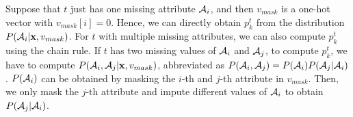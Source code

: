 Suppose that $t$ just  has one missing attribute  $\mathcal{A}_i$, and then $v_{mask}$ is a one-hot vector with $v_{mask}[i] = 0$. Hence, we can directly obtain $p_k^t$  from the distribution $P(\mathcal{A}_i | \mathbf{x}, v_{mask})$. For $t$ with multiple missing attributes, we can also compute $p_k^t$ using the chain rule. If $t$ has two missing values of $\mathcal{A}_i$ and $\mathcal{A}_j$, to compute $p_k^t$, we have to compute $P(\mathcal{A}_i, \mathcal{A}_j | \mathbf{x}, v_{mask})$, abbreviated as $P(\mathcal{A}_i, \mathcal{A}_j) = P(\mathcal{A}_i)P(\mathcal{A}_j | \mathcal{A}_i)$. $P(\mathcal{A}_i)$ can be obtained by masking the $i$-th and $j$-th attribute in $v_{mask}$.
 Then, we only mask the  $j$-th attribute  and impute different values of $\mathcal{A}_i$ to obtain  $P(\mathcal{A}_j | \mathcal{A}_i)$.



 







